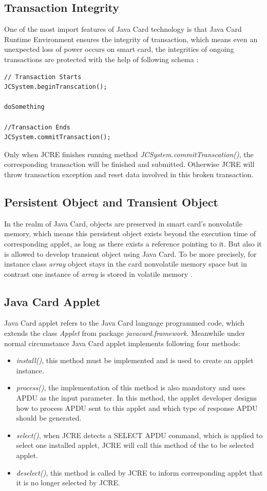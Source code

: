 \subsection{Transaction Integrity}
One of the most import features of Java Card technology is that Java Card Runtime Environment ensures the integrity of transaction, which means even an unexpected loss of power occurs on smart card, the integrities of ongoing transactions are protected with the help of following schema \cite{handbuch}:
\begin{verbatim}
// Transaction Starts
JCSystem.beginTranscation();

doSomething

//Transaction Ends
JCSystem.commitTransaction();
\end{verbatim}
Only when JCRE finishes running method \emph{JCSystem.commitTranscation()}, the corresponding transaction will be finished and submitted. Otherwise JCRE will throw transaction exception and reset data involved in this broken transaction.

\subsection{Persistent Object and Transient Object}
In the realm of Java Card, objects are preserved in smart card's nonvolatile memory, which means this persistent object exists beyond the execution time of corresponding applet, as long as there exists a reference pointing to it. But also it is allowed to develop transient object using Java Card. To be more precisely, for instance class \emph{array} object stays in the card nonvolatile memory space but in contrast one instance of \emph{array} is stored in volatile memory \cite{handbuch}.

\subsection{Java Card Applet}
Java Card applet refers to the Java Card language programmed code, which extends the class \emph{Applet} from package \emph{javacard.framework}. Meanwhile under normal circumstance Java Card applet implements following four methods:
\begin{itemize}
\item\emph{install()}, this method must be implemented and is used to create an applet instance.
\item\emph{process()}, the implementation of this method is also mandatory and uses APDU as the input parameter. In this method, the applet developer designs how to process APDU sent to this applet and which type of response APDU should be generated.
\item \emph{select()}, when JCRE detects a SELECT APDU command, which is applied to select one installed applet, JCRE will call this method of the to be selected applet.
\item  \emph{deselect()}, this method is called by JCRE to inform corresponding applet that it is no longer selected by JCRE.
\end{itemize}

